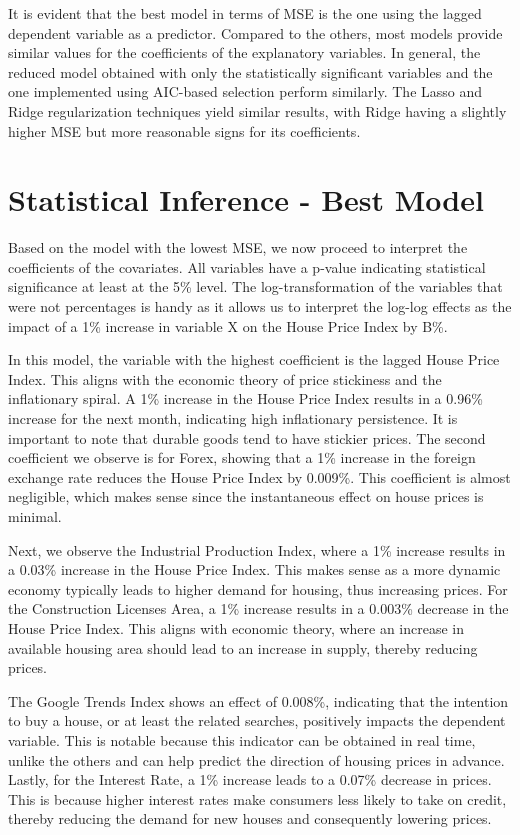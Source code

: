 \documentclass[
]{article}
\begin{document}
It is evident that the best model in terms of MSE is the one using the
lagged dependent variable as a predictor. Compared to the others, most
models provide similar values for the coefficients of the explanatory
variables. In general, the reduced model obtained with only the
statistically significant variables and the one implemented using
AIC-based selection perform similarly. The Lasso and Ridge
regularization techniques yield similar results, with Ridge having a
slightly higher MSE but more reasonable signs for its coefficients.

\section{Statistical Inference - Best
Model}\label{statistical-inference---best-model}

Based on the model with the lowest MSE, we now proceed to interpret the
coefficients of the covariates. All variables have a p-value indicating
statistical significance at least at the 5\% level. The
log-transformation of the variables that were not percentages is handy
as it allows us to interpret the log-log effects as the impact of a 1\%
increase in variable X on the House Price Index by B\%.

In this model, the variable with the highest coefficient is the lagged
House Price Index. This aligns with the economic theory of price
stickiness and the inflationary spiral. A 1\% increase in the House
Price Index results in a 0.96\% increase for the next month, indicating
high inflationary persistence. It is important to note that durable
goods tend to have stickier prices. The second coefficient we observe is
for Forex, showing that a 1\% increase in the foreign exchange rate
reduces the House Price Index by 0.009\%. This coefficient is almost
negligible, which makes sense since the instantaneous effect on house
prices is minimal.

Next, we observe the Industrial Production Index, where a 1\% increase
results in a 0.03\% increase in the House Price Index. This makes sense
as a more dynamic economy typically leads to higher demand for housing,
thus increasing prices. For the Construction Licenses Area, a 1\%
increase results in a 0.003\% decrease in the House Price Index. This
aligns with economic theory, where an increase in available housing area
should lead to an increase in supply, thereby reducing prices.

The Google Trends Index shows an effect of 0.008\%, indicating that the
intention to buy a house, or at least the related searches, positively
impacts the dependent variable. This is notable because this indicator
can be obtained in real time, unlike the others and can help predict the
direction of housing prices in advance. Lastly, for the Interest Rate, a
1\% increase leads to a 0.07\% decrease in prices. This is because
higher interest rates make consumers less likely to take on credit,
thereby reducing the demand for new houses and consequently lowering
prices.
\end{document}

